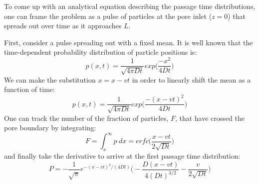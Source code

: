 \documentclass{article}
\begin{document}
  To come up with an analytical equation describing the passage time distributions, 
  one can frame the problem as a pulse of particles at the pore inlet ($z=0$) that 
  spreads out over time as it approaches $L$. 
  
  First, consider a pulse spreading out with a fixed mean. It is well known that the 
  time-dependent probability distribution of particle positions is:
  \begin{equation}
  p(x, t) = \frac{1}{\sqrt{4 \pi D t}}exp\bigg(\frac{-x^2}{4Dt}\bigg)
  \end{equation}
  We can make the substitution $x = x - vt$ in order to linearly shift the mean as a
  function of time:
  \begin{equation}
  p(x, t) = \frac{1}{\sqrt{4 \pi D t}}exp\bigg(\frac{-(x - vt)^2}{4Dt}\bigg)
  \end{equation}
  One can track the number of the fraction of particles, $F$, that have crossed the pore 
  boundary by integrating:
  \begin{equation}
  F = \int_x^\infty p~ dx = erfc\bigg(\frac{x - vt}{2\sqrt{D t}}\bigg)
  \end{equation}
  and finally take the derivative to arrive at the first passage time distribution:
  \begin{equation}
  P = -\frac{1}{\sqrt{\pi}}e^{-(x - vt)^2 / (4Dt)}\bigg(-\frac{D(x - vt)}{4(Dt)^{3/2}} - \frac{v}{2\sqrt{Dt}}\bigg)
  \end{equation}
  
  
\end{document}

